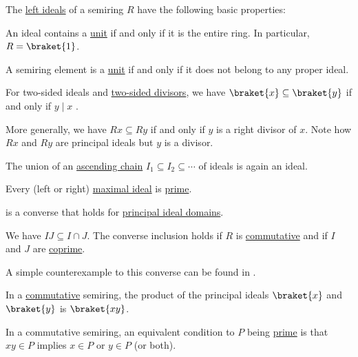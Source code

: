 \begin{proposition}\label{thm:def:semiring_ideal}
  The \hyperref[def:semiring_ideal]{left ideals} of a semiring \( R \) have the following basic properties:
  \begin{thmenum}
     An ideal contains a \hyperref[def:divisibility/unit]{unit} if and only if it is the entire ring. In particular, \( R = \braket{ 1 } \).

     A semiring element is a \hyperref[def:divisibility/unit]{unit} if and only if it does not belong to any proper ideal.

     For two-sided ideals and \hyperref[def:divisibility]{two-sided divisors}, we have \( \braket{ x } \subseteq \braket{ y } \) if and only if \( y \mid x \) .

    More generally, we have \( Rx \subseteq Ry \) if and only if \( y \) is a right divisor of \( x \). Note how \( Rx \) and \( Ry \) are  principal ideals but \( y \) is a  divisor.

     The union of an \hyperref[def:stabilizing_chain]{ascending chain} \( I_1 \subseteq I_2 \subseteq \cdots \) of ideals is again an ideal.

     Every (left or right) \hyperref[def:semiring_ideal/maximal]{maximal ideal} is \hyperref[def:semiring_ideal/prime]{prime}.

     is a converse that holds for \hyperref[def:principal_ideal_domain]{principal ideal domains}.

     We have \( IJ \subseteq I \cap J \). The converse inclusion holds if \( R \) is \hyperref[def:semiring/commutative]{commutative} and if \( I \) and \( J \) are \hyperref[def:semiring_ideal/coprime]{coprime}.

    A simple counterexample to this converse can be found in .

     In a \hyperref[def:semiring/commutative]{commutative} semiring, the product of the principal ideals \( \braket{x} \) and \( \braket{y} \) is \( \braket{xy} \).

     In a commutative semiring, an equivalent condition to \( P \) being \hyperref[def:semiring_ideal/prime]{prime} is that \( xy \in P \) implies \( x \in P \) or \( y \in P \) (or both).
  \end{thmenum}
\end{proposition}
